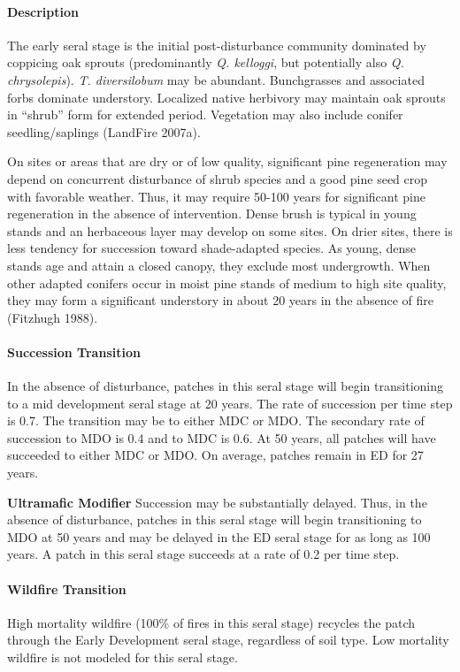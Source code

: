 \paragraph*{Description}
The early seral stage is the initial post-disturbance community dominated by coppicing oak sprouts (predominantly \emph{Q. kelloggi}, but potentially also \emph{Q. chrysolepis}). \emph{T. diversilobum} may be abundant. Bunchgrasses and associated forbs dominate understory. Localized native herbivory may maintain oak sprouts in ``shrub'' form for extended period. Vegetation may also include conifer seedling/saplings (LandFire 2007a).

On sites or areas that are dry or of low quality, significant pine regeneration may depend on concurrent disturbance of shrub species and a good pine seed crop with favorable weather. Thus, it may require 50-100 years for significant pine regeneration in the absence of intervention. Dense brush is typical in young stands and an herbaceous layer may develop on some sites. On drier sites, there is less tendency for succession toward shade-adapted species. As young, dense stands age and attain a closed canopy, they exclude most undergrowth. When other adapted conifers occur in moist pine stands of medium to high site quality, they may form a significant understory in about 20 years in the absence of fire (Fitzhugh 1988).

\paragraph*{Succession Transition} In the absence of disturbance, patches in this seral stage will begin transitioning to a mid development seral stage at 20 years. The rate of succession per time step is 0.7. The transition may be to either MDC or MDO. The secondary rate of succession to MDO is 0.4 and to MDC is 0.6. At 50 years, all patches will have succeeded to either MDC or MDO. On average, patches remain in ED for 27 years.
\begin{adjustwidth}{2cm}{}
\medskip
\textbf{Ultramafic Modifier} Succession may be substantially delayed. Thus, in the absence of disturbance, patches in this seral stage will begin transitioning to MDO at 50 years and may be delayed in the ED seral stage for as long as 100 years. A patch in this seral stage succeeds at a rate of 0.2 per time step. 

\end{adjustwidth}
\paragraph*{Wildfire Transition}
High mortality wildfire (100\% of fires in this seral stage) recycles the patch through the Early Development seral stage, regardless of soil type. Low mortality wildfire is not modeled for this seral stage.


